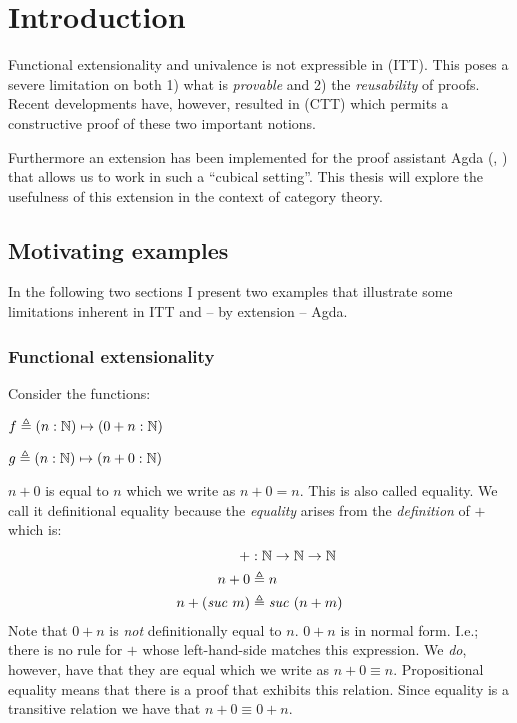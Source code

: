 \chapter{Introduction}
Functional extensionality and univalence is not expressible in
 (ITT). This poses a severe limitation
on both 1) what is \emph{provable} and 2) the \emph{reusability} of proofs.
Recent developments have, however, resulted in  (CTT)
which permits a constructive proof of these two important notions.

Furthermore an extension has been implemented for the proof assistant Agda
(\cite{agda}, \cite{cubical-agda}) that allows us to work in such a ``cubical
setting''. This thesis will explore the usefulness of this extension in the
context of category theory.
%
\section{Motivating examples}
%
In the following two sections I present two examples that illustrate some
limitations inherent in ITT and -- by extension -- Agda.
%
\subsection{Functional extensionality}
Consider the functions:
%
\begin{multicols}{2}
$f \triangleq (n : \mathbb{N}) \mapsto (0 + n : \mathbb{N})$

$g \triangleq (n : \mathbb{N}) \mapsto (n + 0 : \mathbb{N})$
\end{multicols}
%
$n + 0$ is  equal to $n$ which we write as $n + 0 = n$.
This is also called  equality. We call it definitional
equality because the \emph{equality} arises from the \emph{definition} of $+$
which is:
%
\newcommand{\suc}[1]{\mathit{suc}\ #1}
\begin{align*}
  +           & : \bN \to \bN \to \bN      \\
  n + 0       & \defeq n                   \\
  n + (\suc{m}) & \defeq \suc{(n + m)}
\end{align*}
%
Note that $0 + n$ is \emph{not} definitionally equal to $n$. $0 + n$ is in
normal form. I.e.; there is no rule for $+$ whose left-hand-side matches this
expression. We \emph{do}, however, have that they are 
equal which we write as $n + 0 \equiv n$. Propositional equality means that
there is a proof that exhibits this relation. Since equality is a transitive
relation we have that $n + 0 \equiv 0 + n$.

